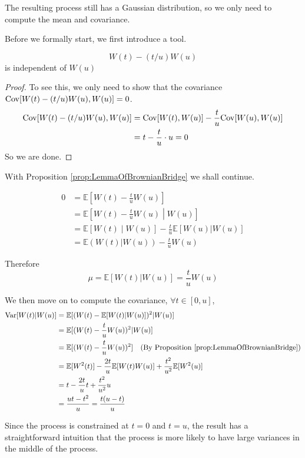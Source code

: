         The resulting process still has a Gaussian distribution, so we only need to compute the mean and covariance.

        Before we formally start, we first introduce a tool.
        \begin{proposition}\label{prop:LemmaOfBrownianBridge}
            \[ W(t) - (t/u)W(u) \]
            is independent of $W(u)$
        \end{proposition}
        \begin{proof}
            To see this, we only need to show that the covariance $\mathrm{Cov}[W(t)-(t/u)W(u), W(u)] = 0$.
            \begin{align*}
                \mathrm{Cov}[W(t) - (t/u)W(u), W(u)] &= \mathrm{Cov}[W(t),W(u)] - \frac{t}{u}\mathrm{Cov}[W(u), W(u)]\\
                &= t - \frac{t}{u} \cdot u = 0
            \end{align*}
            So we are done.
        \end{proof}

        With Proposition \ref{prop:LemmaOfBrownianBridge} we shall continue.

        \begin{align*}
            0 &= \mathbb{E}\left[ W(t) - \frac{t}{u}W(u) \right]\\
            &= \mathbb{E}\left[ W(t) - \frac{t}{u} W(u) \middle| W(u) \right]\\
            &= \mathbb{E}\left[ W(t) \middle| W(u) \right] - \frac{t}{u}\mathbb{E}[W(u) | W(u)]\\
            &= \mathbb{E}\left(W(t) | W(u)\right) - \frac{t}{u}W(u)
        \end{align*}

        Therefore
        \[ \mu = \mathbb{E}[W(t)|W(u)] = \frac{t}{u}W(u) \]

        We then move on to compute the covariance, $\forall t \in [0, u]$,
        \begin{align*}
            \mathrm{Var}[W(t) | W(u)] &= \mathbb{E}[(W(t) - \mathbb{E}[W(t)|W(u)])^2 | W(u)]\\
            &= \mathbb{E}[(W(t)- \frac{t}{u}W(u))^2 | W(u)]\\
            &= \mathbb{E}[(W(t) - \frac{t}{u}W(u))^2] \quad \text{(By Proposition \ref{prop:LemmaOfBrownianBridge})}\\
            &= \mathbb{E}[W^2(t)] - \frac{2t}{u}\mathbb{E}[W(t)W(u)] + \frac{t^2}{u^2}\mathbb{E}[W^2(u)]\\
            &= t - \frac{2t}{u}t + \frac{t^2}{u^2}u\\
            &= \frac{ut - t^2}{u} = \frac{t(u-t)}{u}
        \end{align*}
        \begin{remark}
            Since the process is constrained at $t=0$ and $t=u$, the result has a straightforward intuition that the process is more likely to have large variances in the middle of the process.
        \end{remark}

